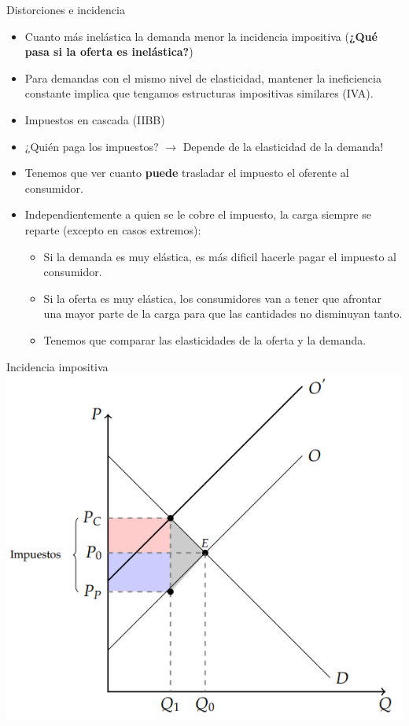 \documentclass{beamer}
\begin{document}
\begin{frame}{Distorciones e incidencia}
    \begin{itemize}
        \item Cuanto más inelástica la demanda menor la incidencia impositiva (\textbf{¿Qué pasa si la oferta es inelástica?})
        \item Para demandas con el mismo nivel de elasticidad, mantener la ineficiencia constante implica que tengamos estructuras impositivas similares (IVA).
        \item Impuestos en cascada (IIBB)
        \item ¿Quién paga los impuestos? $\rightarrow$ Depende de la elasticidad de la demanda!
        \item Tenemos que ver cuanto \textbf{puede} trasladar el impuesto el oferente al consumidor.
        \item Independientemente a quien se le cobre el impuesto, la carga siempre se reparte (excepto en casos extremos):
        \begin{itemize}
            \item Si la demanda es muy elástica, es más dificil hacerle pagar el impuesto al consumidor.
            \item Si la oferta es muy elástica, los consumidores van a tener que afrontar una mayor parte de la carga para que las cantidades no disminuyan tanto.
            \item Tenemos que comparar las elasticidades de la oferta y la demanda.
        \end{itemize}
    \end{itemize}
\end{frame}

\begin{frame}{Incidencia impositiva}
    \centering
    \includegraphics[scale=0.7]{../Figures/C24.4.png}
\end{frame}
\end{document}
